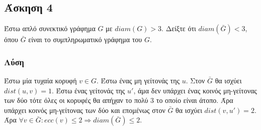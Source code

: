 \subsection*{Άσκηση 4}

Έστω απλό συνεκτικό γράφημα $G$ με $diam(G) > 3$. Δείξτε ότι $diam(\bar G) < 3$, όπου $\bar G$ είναι 
το συμπληρωματικό γράφημα του $G$.

\subsubsection*{Λύση}

Έστω μία τυχαία κορυφή $v \in G$. Έστω ένας μη γείτονάς της $u$. Στον $\bar G$ θα ισχύει $dist(u,v) = 1$.
Έστω ένας γείτονάς της $u'$, άμα δεν υπάρχει ένας κοινός μη-γείτονας των δύο τότε όλες οι κορυφές θα απήχαν το πολύ 3 το οποίο είναι άτοπο.
Άρα υπάρχει κοινός μη-γείτονας των δύο και επομένως στον $\bar G$ θα ισχύει $dist(v,u') = 2$. Άρα $\forall v \in \bar G : ecc(v) \le 2 \Rightarrow diam(\bar G) \le 2$.

